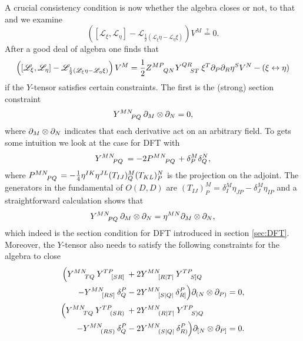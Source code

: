 A crucial consistency condition is now whether the algebra closes or not, to that and we examine 
\begin{equation}\label{eq:closure}
    \left(\left[\mathscr{L}_\xi,\mathscr{L}_\eta\right]-\mathscr{L}_{\frac{1}{2}\left(\mathscr{L}_\xi\eta-\mathscr{L}_\eta\xi\right)}\right)V^M\overset{?}{=}0.
\end{equation}
After a good deal of algebra one finds that 
\begin{equation}\label{eq:GenDiffComm}
    \left(\left[\mathscr{L}_\xi,\mathscr{L}_\eta\right]-\mathscr{L}_{\frac{1}{2}\left(\mathscr{L}_\xi\eta-\mathscr{L}_\eta\xi\right)}\right)V^M = \frac{1}{2}\tensor{Z}{^{MP}_{QN}}\tensor{Y}{^{QR}_{ST}}\xi^T\pd_P\pd_R\eta^SV^N-\left(\xi\leftrightarrow\eta\right)
\end{equation}
if the $Y$-tensor satisfies certain constraints. The first is the (strong) section constraint 
\begin{equation}
    \tensor{Y}{^{MN}_{PQ}}\pd_M\otimes\pd_N = 0,
\end{equation}
where $\partial_M\otimes\partial_N$ indicates that each derivative act on an arbitrary field. To gets some intuition we look at the case for DFT with
\begin{equation}
    \tensor{Y}{^{MN}_{PQ}}=-2\tensor{P}{^{MN}_{PQ}}+\delta^M_P\delta^N_Q,
\end{equation}
where $\tensor{P}{^{MN}_{PQ}}=-\frac{1}{4}\eta^{IK}\eta^{JL}(T_{IJ})^M_Q(T_{KL})^N_P$ is the projection on the adjoint. The generators in the fundamental of $O(D,D)$ \cite{Berman2014} are $(T_{IJ})^M_P=\delta^M_I\eta_{JP}-\delta_J^M\eta_{IP}$ and a straightforward calculation shows that 
\begin{equation}\label{eq:section}
    \tensor{Y}{^{MN}_{PQ}}\pd_M\otimes\pd_N = \eta^{MN}\pd_M\otimes\pd_N,
\end{equation}
which indeed is the section condition for DFT introduced in section \ref{sec:DFT}. Moreover, the $Y$-tensor also needs to satisfy the following constraints for the algebra to close
\begin{subequations}
    \begin{align}
        \begin{split}
        \Big(\tensor{Y}{^{MN}_{TQ}}\tensor{Y}{^{TP}_{[SR]}}&+2\tensor{Y}{^{MN}_{[R|T|}}\tensor{Y}{^{TP}_{S]Q}}\\
        -\tensor{Y}{^{MN}_{[RS]}}\delta^P_Q&-2\tensor{Y}{^{MN}_{[S|Q|}}\delta_{R]}^P\Big)\pd_{(N}\otimes\pd_{P)}=0,
        \end{split}\label{eq:closure1}
        \\
        \begin{split}
        \Big(\tensor{Y}{^{MN}_{TQ}}\tensor{Y}{^{TP}_{(SR)}}&+2\tensor{Y}{^{MN}_{(R|T|}}\tensor{Y}{^{TP}_{S)Q}}\\
        -\tensor{Y}{^{MN}_{(RS)}}\delta^P_Q&-2\tensor{Y}{^{MN}_{(S|Q|}}\delta_{R)}^P\Big)\pd_{[N}\otimes\pd_{P]}=0.
        \end{split}\label{eq:closure2}
    \end{align}
    \end{subequations}

